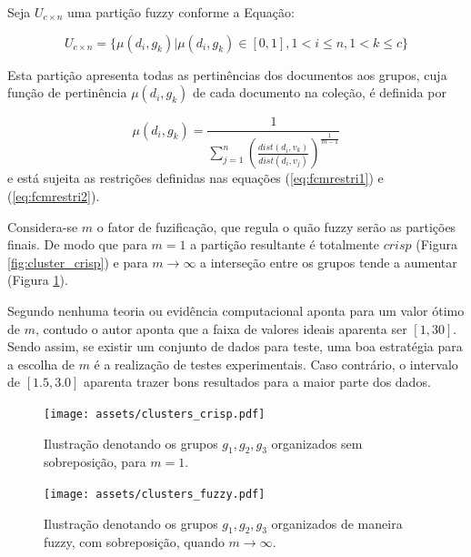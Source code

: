 Seja $U_{c \times n}$ uma partição fuzzy conforme a Equação:

\begin{equation} 
  U_{c \times n} = \{\mu(d_i, g_k) |\mu(d_i, g_k) \in [0,1], 1 < i \leq n, 1 < k \leq c\} 
  \label{eq:part_fuzzy} 
\end{equation} 

Esta partição apresenta todas as pertinências dos documentos aos grupos, cuja função de 
pertinência $\mu(d_i,g_k)$ de cada documento na coleção, é definida por 

\begin{equation} 
  \mu(d_i,g_k) = \frac{1}{\sum_{j=1}^n(\frac{dist(d_i,v_k)}{dist(d_i,v_j)})^{\frac{1}{m-1}}} 
  \label{eq:pertinencia}
\end{equation}
e está sujeita as restrições definidas nas equações (\ref{eq:fcmrestri1}) e (\ref{eq:fcmrestri2}).

Considera-se $m$ o fator de fuzificação, que regula o quão fuzzy serão as partições finais. De modo
que para $m = 1$ a partição resultante é totalmente $crisp$ (Figura \ref{fig:cluster_crisp}) e para
$m \rightarrow \infty$ a interseção entre os grupos tende a aumentar (Figura
\ref{fig:cluster_fuzzy})\cite{Pal2005}. 

Segundo  nenhuma teoria ou evidência computacional aponta para um valor ótimo
de $m$, contudo o autor aponta que a faixa de valores ideais aparenta ser $[1,30]$. Sendo assim, se
existir um conjunto de dados para teste, uma boa estratégia para a escolha de $m$ é a realização de
testes experimentais. Caso contrário, o intervalo de $[1.5, 3.0]$ aparenta trazer bons resultados
para a maior parte dos dados.

\begin{figure}[!htp] \centering 
   \begin{minipage}{0.45\textwidth} 
     \centering
    \texttt{[image: assets/clusters\_crisp.pdf]} 
    \caption{Ilustração denotando os
grupos $g_1,g_2,g_3$ organizados sem sobreposição, para $m = 1$.} 
  \label{fig:cluster_crisp}
  \end{minipage}\hfill 
  \begin{minipage}{0.45\textwidth} \centering
    \texttt{[image: assets/clusters\_fuzzy.pdf]} 
    \caption{Ilustração denotando os
     grupos $g_1,g_2,g_3$ organizados de maneira fuzzy, com sobreposição, quando 
     $m \rightarrow \infty$.}
     \label{fig:cluster_fuzzy} 
   \end{minipage} 
\end{figure}

